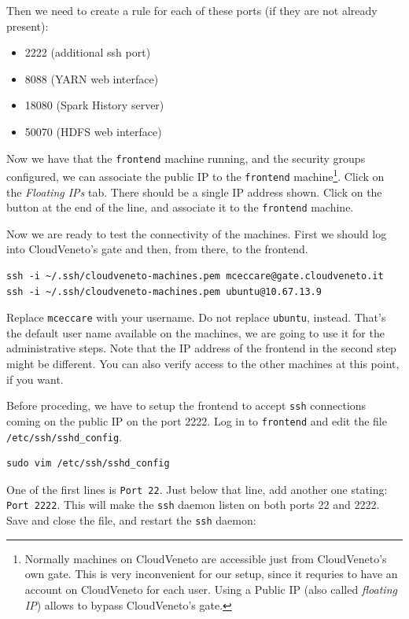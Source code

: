 \documentclass[justified]{tufte-handout}
\providecommand{\tightlist}{%
  \setlength{\itemsep}{0pt}\setlength{\parskip}{0pt}}
\begin{document}
Then we need to create a rule for each of these ports (if they are not
already present):

\begin{itemize}
\tightlist
\item
  2222 (additional ssh port)
\item
  8088 (YARN web interface)
\item
  18080 (Spark History server)
\item
  50070 (HDFS web interface)
\end{itemize}

Now we have that the \texttt{frontend} machine running, and the security
groups configured, we can associate the public IP to the
\texttt{frontend} machine\footnote{Normally machines on CloudVeneto are
  accessible just from CloudVeneto's own gate. This is very inconvenient
  for our setup, since it requries to have an account on CloudVeneto for
  each user. Using a Public IP (also called \emph{floating IP}) allows
  to bypass CloudVeneto's gate.}. Click on the \emph{Floating IPs} tab.
There should be a single IP address shown. Click on the button at the
end of the line, and associate it to the \texttt{frontend} machine.

Now we are ready to test the connectivity of the machines. First we
should log into CloudVeneto's gate and then, from there, to the
frontend.

\begin{verbatim}
ssh -i ~/.ssh/cloudveneto-machines.pem mceccare@gate.cloudveneto.it
ssh -i ~/.ssh/cloudveneto-machines.pem ubuntu@10.67.13.9
\end{verbatim}

Replace \texttt{mceccare} with your username. Do not replace
\texttt{ubuntu}, instead. That's the default user name available on the
machines, we are going to use it for the administrative steps. Note that
the IP address of the frontend in the second step might be different.
You can also verify access to the other machines at this point, if you
want.

Before proceding, we have to setup the frontend to accept \texttt{ssh}
connections coming on the public IP on the port 2222. Log in to
\texttt{frontend} and edit the file \texttt{/etc/ssh/sshd\_config}.

\begin{verbatim}
sudo vim /etc/ssh/sshd_config
\end{verbatim}

One of the first lines is \texttt{Port\ 22}. Just below that line, add
another one stating: \texttt{Port\ 2222}. This will make the
\texttt{ssh} daemon listen on both ports 22 and 2222. Save and close the
file, and restart the \texttt{ssh} daemon:
\end{document}
